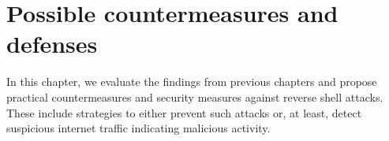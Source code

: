 \chapter{Possible countermeasures and defenses}

\label{chap:countermeasures}

In this chapter, we evaluate the findings from previous chapters and propose practical countermeasures and security measures against reverse shell attacks. These include strategies to either prevent such attacks or, at least, detect suspicious internet traffic indicating malicious activity.